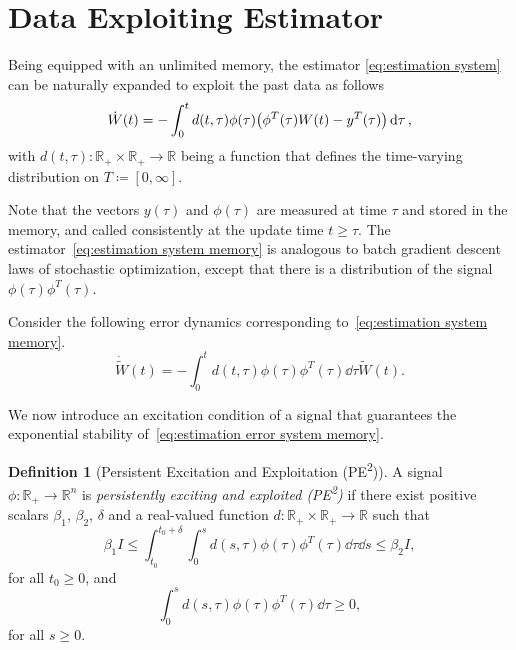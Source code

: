 \documentclass[]{IEEEtran}
\theoremstyle{definition}
\newtheorem{definition}{Definition}
\theoremstyle{remark}
\newcommand{\MB}[1]{\mathbb{#1}}
\newcommand{\tsup}[1]{\textsuperscript{#1}}
\begin{document}
\section{Data Exploiting Estimator}

Being equipped with an unlimited memory, the estimator \eqref{eq:estimation
system} can be naturally expanded to exploit the past data as follows
\begin{equation}\label{eq:estimation system memory}
	\dot{W}(t) = - \int_0^t d(t, \tau) \phi(\tau) \qty(\phi^T(\tau) W(t) -
	y^T(\tau)) \dd{\tau},
\end{equation}
with $d(t, \tau): \MB{R}_{+} \times \MB{R}_{+} \to \MB{R}$ being a function
that defines the time-varying distribution on $T \coloneqq [0, \infty]$.

Note that the vectors $y(\tau)$ and $\phi(\tau)$ are measured at time $\tau$ and
stored in the memory, and called consistently at the update time $t \ge \tau$.
The estimator~\eqref{eq:estimation system memory} is analogous to batch
gradient descent laws of stochastic optimization, except that there is a
distribution of the signal $\phi(\tau) \phi^T(\tau)$.

Consider the following error dynamics corresponding to~\eqref{eq:estimation
system memory}.
\begin{equation}\label{eq:estimation error system memory}
	\dot{\tilde{W}}(t) = - \int_0^t d(t, \tau) \phi(\tau) \phi^T(\tau) \dd{\tau}
	\tilde{W}(t).
\end{equation}

We now introduce an excitation condition of a signal that guarantees the
exponential stability of~\eqref{eq:estimation error system memory}.

\begin{definition}[Persistent Excitation and Exploitation
	(PE\tsup{2})]
	A signal $\phi: \MB{R}_{+} \to \MB{R}^n$ is \textit{persistently exciting and
	exploited (PE\tsup{2})} if there exist positive scalars $\beta_1$, $\beta_2$,
	$\delta$ and a real-valued function $d : \MB{R}_{+} \times \MB{R}_{+} \to
	\MB{R}$ such that
	\begin{equation}\label{eq:PE2 cond 1}
		\beta_1 I \le \int_{t_0}^{t_0+\delta} \int_{0}^s d(s, \tau) \phi(\tau)
		\phi^T(\tau) \dd{\tau} \dd{s} \le \beta_2 I,
	\end{equation}
	for all $t_0 \ge 0$, and
	\begin{equation}\label{eq:PE2 cond 2}
		\int_0^s d(s, \tau) \phi(\tau) \phi^T(\tau) \dd{\tau} \ge 0,
	\end{equation}
	for all $s \ge 0$.
\end{definition}
\end{document}
